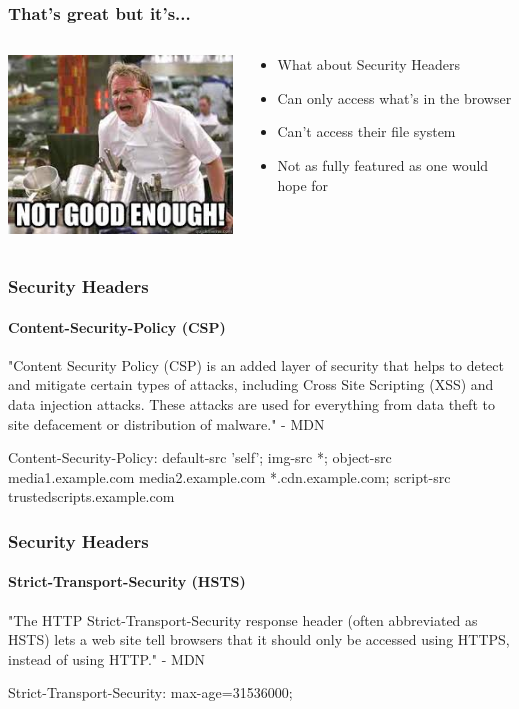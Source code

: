 \documentclass[aspectratio=169]{beamer}
\begin{document}
\begin{frame}
  \frametitle{That's great but it's...}
  \begin{columns}
    \begin{column}{0.5\textwidth}
      \includegraphics[scale=0.5]{notgoodenough}
    \end{column}
    \begin{column}{0.5\textwidth}
      \begin{itemize}
      \item What about Security Headers
      \item Can only access what's in the browser
      \item Can't access their file system
      \item Not as fully featured as one would hope for
      \end{itemize}
    \end{column}
  \end{columns}
\end{frame}
\begin{frame}
  \frametitle{Security Headers}
  \framesubtitle{Content-Security-Policy (CSP)}
  "Content Security Policy (CSP) is an added layer of security that helps to detect and mitigate certain types of attacks, including Cross Site Scripting (XSS) and data injection attacks. These attacks are used for everything from data theft to site defacement or distribution of malware." - MDN\\
  \bigskip
  \begin{tcolorbox}[title=Content-Security-Policy Header Example,colback=gray]
    Content-Security-Policy: default-src 'self'; img-src *; object-src media1.example.com media2.example.com *.cdn.example.com; script-src trustedscripts.example.com
  \end{tcolorbox}
\end{frame}
\begin{frame}
  \frametitle{Security Headers}
  \framesubtitle{Strict-Transport-Security (HSTS)}
  "The HTTP Strict-Transport-Security response header (often abbreviated as HSTS)  lets a web site tell browsers that it should only be accessed using HTTPS, instead of using HTTP." - MDN\\
  \bigskip
  \begin{tcolorbox}[title=Strict-Transport-Security Header Example,colback=gray]
    Strict-Transport-Security: max-age=31536000;
  \end{tcolorbox}
\end{frame}
\end{document}
